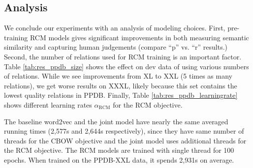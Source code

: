 \documentclass[11pt]{article}
\newcommand{\tableref}[1]{Table~\ref{#1}}
\begin{document}
\subsection{Analysis}
We conclude our experiments with an analysis of modeling choices. First, pre-training RCM models gives
significant improvements in both measuring semantic similarity and capturing human judgements (compare ``p'' vs. ``r'' results.)
Second, the number of relations used for RCM training is an important factor. Table \ref{tab:res_ppdb_size} shows the effect
on dev data of using various numbers of relations. While we see improvements from XL to XXL (5 times as many relations), we
get worse results on XXXL, likely because this set contains the lowest quality relations in PPDB.
Finally, Table \ref{tab:res_ppdb_learningrate} shows different learning rates $\alpha_{\textrm{RCM}}$
for the RCM objective.

The baseline word2vec and the joint model have nearly the same averaged running times (2,577s and 2,644s respectively), since they have same number of threads for the CBOW objective and the joint model uses additional threads for the RCM objective. The RCM models are trained with single thread for 100 epochs. When trained on the PPDB-XXL data, it spends 2,931s on average.



%
\end{document}
